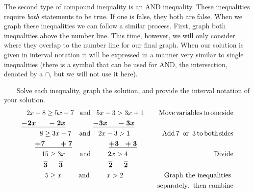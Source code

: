 \pagebreak

The second type of compound inequality is an AND inequality. These inequalities require \textit{both} statements to be true. If one is false, they both are false. When we graph these inequalities we can follow a similar process.  First, graph both inequalities above the number line.  This time, however, we will only consider where they overlap to the number line for our final graph. When our solution is given in interval notation it will be expressed in a manner very similar to single inequalities (there is a symbol that can be used for AND, the intersection, denoted by a $\cap$, but we will not use it here).

%
\begin{example}\label{Lin101}~~~ Solve each inequality, graph the solution, and provide the interval notation of your solution.
  \begin{eqnarray*}
    2 x + 8 \geq 5 x - 7 \tmop{~~and~~} 5 x - 3 > 3 x + 1 &  & \tmop{Move}
    \tmop{variables} \tmop{to} \tmop{one} \tmop{side}\\
    \tmmathbf{\underline{- 2 x ~~~~~- 2 x}} ~~~~~~~~~~~~  \tmmathbf{\underline{- 3 x ~~~~- 3 x}}~~~~  &  & \\
    8 \geq 3 x - 7 \tmop{~~~and~~~} 2 x - 3 > 1~~~~~~ &  & \tmop{Add} 7 \tmop{~or~} 3
    \tmop{to} \tmop{both} \tmop{sides}\\
    \tmmathbf{\underline{+ 7 ~~~~~~+ 7}} ~~~~~~~~~~~~~~~~ \tmmathbf{\underline{+ 3 ~~+ 3}}~~~ &  & \\
    15 \geq 3 x \tmop{~~~~~~and~~~~~~~} 2 x > 4~~~~~~~ &  & \tmop{Divide}\\
    \tmmathbf{\overline{3} ~~~~~ \overline{3}} ~~~~~~~~~~~~~~~~~~~~ \tmmathbf{\overline{2} ~~~~~ \overline{2}}~~~~~~~ &  & \\
    5 \geq x \tmop{~~~~~~~and~~~~~~~} x > 2~~~~~~~~~ &  & \tmop{Graph~the~inequalities~}\\
		& & ~~~\tmop{separately,~then~combine}%
  \end{eqnarray*}
\end{example}

